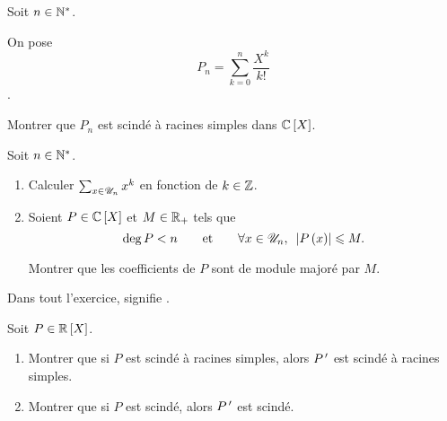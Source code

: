 \begin{corr}
\end{corr}

\begin{exo}
Soit \(n\in\mathbb{N}^*\).

On pose \[P_n=\sum_{k=0}^n\dfrac{X^k}{k!}\].

Montrer que \(P_n\) est scindé à racines simples dans \(\poly[\C]\).
\end{exo}

\begin{corr}
\end{corr}

\begin{exo}
Soit \(n\in\mathbb{N}^*\).

\begin{enumerate}
\item Calculer \(\sum_{x\in\mathscr{U}_n}x^k\) en fonction de \(k\in\mathbb{Z}\). \\

\item Soient \(P\in\poly[\C]\) et \(M\in\mathbb{R}_+\) tels que \[\deg P<n\qquad\text{et}\qquad\quantifs{\forall x\in\U_n}\abs{P\paren{x}}\leq M.\]

Montrer que les coefficients de \(P\) sont de module majoré par \(M\).
\end{enumerate}
\end{exo}

\begin{corr}
\end{corr}

\begin{exo}[Classique]
Dans tout l'exercice,  signifie .

Soit \(P\in\poly[\R]\).

\begin{enumerate}
\item Montrer que si \(P\) est scindé à racines simples, alors \(P^{\,\prime}\) est scindé à racines simples. \\

\item Montrer que si \(P\) est scindé, alors \(P^{\,\prime}\) est scindé.
\end{enumerate}
\end{exo}

\begin{corr}
\end{corr}

